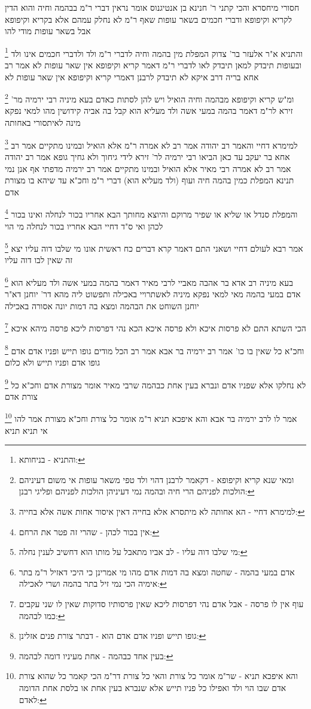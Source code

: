\documentclass[12pt, openany]{book}
\newcommand{\footnotecomment}[1]{
	\renewcommand\thefootnote{}
	\footnote{#1}}
\newcommand{\commenta}[1]{\footnotecomment{#1}}
\begin{document}
{חסורי מיחסרא והכי קתני ר' חנינא בן אנטיגנוס אומר נראין דברי ר"מ בבהמה וחיה והוא הדין לקריא וקיפופא ודברי חכמים בשאר עופות שאף ר"מ לא נחלק עמהם אלא בקריא וקיפופא אבל בשאר עופות מודי להו 
\commenta{והתניא - בניחותא:}
והתניא א"ר אלעזר בר' צדוק המפלת מין בהמה וחיה לדברי ר"מ ולד ולדברי חכמים אינו ולד ובעופות תיבדק 
למאן תיבדק לאו לדברי ר"מ דאמר קריא וקיפופא אין שאר עופות לא 
אמר רב אחא בריה דרב איקא לא תיבדק לרבנן דאמרי קריא וקיפופא אין שאר עופות לא 
\commenta{ומאי שנא קריא וקיפופא - דקאמר לרבנן דהוי ולד טפי משאר עופות אי משום דעיניהם הולכות לפניהם הרי חיה ובהמה נמי דעיניהן הולכות לפניהם ופליגי רבנן:}
ומ"ש קריא וקיפופא מבהמה וחיה הואיל ויש להן לסתות כאדם 
בעא מיניה רבי ירמיה מר' זירא לר"מ דאמר בהמה במעי אשה ולד מעליא הוא קבל בה אביה קידושין מהו למאי נפקא מינה לאיתסורי באחותה 
\commenta{למימרא דחיי - הא אחותה לא מיתסרא אלא בחייה דאין איסור אחות אשה אלא בחייה:}
למימרא דחיי והאמר רב יהודה אמר רב לא אמרה ר"מ אלא הואיל ובמינו מתקיים אמר רב אחא בר יעקב עד כאן הביאו רבי ירמיה לר' זירא לידי גיחוך ולא גחיך 
גופא אמר רב יהודה אמר רב לא אמרה רבי מאיר אלא הואיל ובמינו מתקיים אמר רב ירמיה מדפתי
אף אנן נמי תנינא המפלת כמין בהמה חיה ועוף (ולד מעליא הוא) דברי ר"מ וחכ"א עד שיהא בו מצורת אדם 
\commenta{אין בכור לכהן - שהרי זה פטר את הרחם:}
והמפלת סנדל או שליא או שפיר מרוקם והיוצא מחותך הבא אחריו בכור לנחלה ואינו בכור לכהן ואי ס"ד דחיי הבא אחריו בכור לנחלה מי הוי 
\commenta{מי שלבו דוה עליו - לב אביו מתאבל על מותו הוא דחשיב לענין נחלה:}
אמר רבא לעולם דחיי ושאני התם דאמר קרא {דברים כח } ראשית אונו מי שלבו דוה עליו יצא זה שאין לבו דוה עליו 
\commenta{אדם במעי בהמה - שחטה ומצא בה דמות אדם מהו מי אמרינן כי היכי דאזיל ר"מ בתר אימיה הכי נמי זיל בתר בהמה ושרי לאכילה:}
בעא מיניה רב אדא בר אהבה מאביי לרבי מאיר דאמר בהמה במעי אשה ולד מעליא הוא אדם במעי בהמה מאי למאי נפקא מיניה לאשתרויי באכילה 
ותפשוט ליה מהא דר' יוחנן דא"ר יוחנן השוחט את הבהמה ומצא בה דמות יונה אסורה באכילה 
\commenta{עוף אין לו פרסה - אבל אדם נהי דפרסות ליכא שאין פרסותיו סדוקות שאין לו שני עקבים כמו לבהמה:}
הכי השתא התם לא פרסות איכא ולא פרסה איכא הכא נהי דפרסות ליכא פרסה מיהא איכא
\commenta{גופו תייש ופניו אדם אדם הוא - דבתר צורת פנים אזלינן:}
וחכ"א כל שאין בו כו' אמר רב ירמיה בר אבא אמר רב הכל מודים גופו תייש ופניו אדם אדם גופו אדם ופניו תייש ולא כלום
\commenta{בעין אחד כבהמה - אחת מעיניו דומה לבהמה: }
לא נחלקו אלא שפניו אדם ונברא בעין אחת כבהמה שרבי מאיר אומר מצורת אדם וחכ"א כל צורת אדם 
\commenta{והא איפכא תניא - שר"מ אומר כל צורת והאי כל צורת דר"מ הכי קאמר כל שהוא צורת אדם שבו הוי ולד ואפילו כל פניו תייש אלא שנברא בעין אחת או בלסת אחת הדומה לאדם:}
אמר לו לרב ירמיה בר אבא והא איפכא תניא ר"מ אומר כל צורת וחכ"א מצורת אמר להו אי תניא תניא 
}
\end{document}
